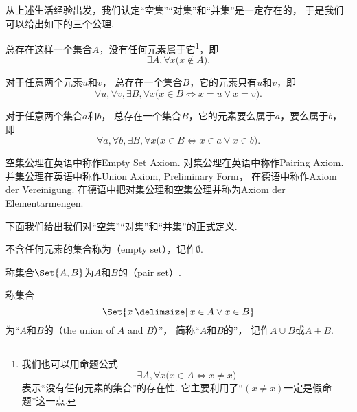 从上述生活经验出发，我们认定“空集”“对集”和“并集”是一定存在的，
于是我们可以给出如下的三个公理.

\begin{axiom}[空集公理]\label{axiom:集合论.空集公理}
总存在这样一个集合\(A\)，没有任何元素属于它\footnote{%
我们也可以用命题公式\[
	\exists A, \forall x \bigl( x \in A \iff x \neq x \bigr)
\]表示“没有任何元素的集合”的存在性.
它主要利用了“\((x \neq x)\)一定是假命题”这一点.
}，即\[
	\exists A, \forall x \bigl( x \notin A \bigr).
\]
\end{axiom}

\begin{axiom}[对集公理]\label{axiom:集合论.对集公理}
对于任意两个元素\(u\)和\(v\)，
总存在一个集合\(B\)，它的元素只有\(u\)和\(v\)，即\[
	\forall u, \forall v, \exists B, \forall x
	\bigl(
		x \in B \iff x = u \lor x = v
	\bigr).
\]
\end{axiom}

\begin{axiom}[并集公理I]
对于任意两个集合\(a\)和\(b\)，
总存在一个集合\(B\)，它的元素要么属于\(a\)，要么属于\(b\)，即\[
	\forall a, \forall b, \exists B, \forall x
	\bigl(
		x \in B
		\iff
		x \in a \lor x \in b
	\bigr).
\]
\end{axiom}

空集公理在英语中称作Empty Set Axiom.
对集公理在英语中称作Pairing Axiom.
并集公理在英语中称作Union Axiom, Preliminary Form，
在德语中称作Axiom der Vereinigung.
在德语中把对集公理和空集公理并称为Axiom der Elementarmengen.

下面我们给出我们对“空集”“对集”和“并集”的正式定义.

\begin{definition}
不含任何元素的集合称为（empty set），记作\(\emptyset\).
\end{definition}

\begin{definition}
称集合\(\Set{ A, B }\)为\(A\)和\(B\)的（pair set）.
\end{definition}

\begin{definition}
称集合\[
	\Set{ x \given x \in A \lor x \in B }
\]为“\(A\)和\(B\)的（the union of \(A\) and \(B\)）”，%
简称“\(A\)和\(B\)的”，%
记作\(A \cup B\)或\(A+B\).
\end{definition}


